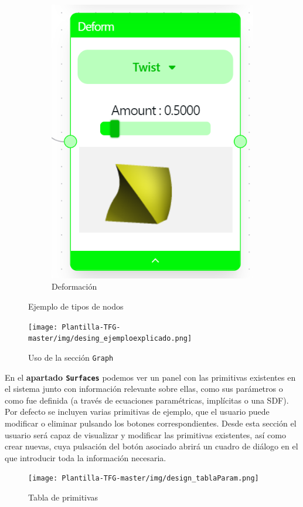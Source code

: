 \begin{figure}[!h]
\begin{subfigure}[b]{0.21\textwidth}
        \includegraphics[width=\textwidth]{Plantilla-TFG-master/img/nodo_def.png}
        \caption{Deformación}
    \end{subfigure}
    \hfill
    \caption{Ejemplo de tipos de nodos}
\end{figure}

\begin{figure}[ht!]
    \centering
    \texttt{[image: Plantilla-TFG-master/img/desing\_ejemploexplicado.png]}
    
    \caption{Uso de la sección \texttt{Graph}} 
    \label{fig:ejemploCsgExplicado}
\end{figure}

En el \textbf{apartado \texttt{Surfaces}} podemos ver un panel con las primitivas existentes en el sistema junto con información relevante sobre ellas, como sus parámetros o como fue definida (a través de ecuaciones paramétricas, implícitas o una SDF). Por defecto se incluyen varias primitivas de ejemplo, que el usuario puede modificar o eliminar pulsando los botones correspondientes. Desde esta sección el usuario será capaz de visualizar y modificar las primitivas existentes, así como crear nuevas, cuya pulsación del botón asociado abrirá un cuadro de diálogo en el que introducir toda la información necesaria.\newline
\begin{figure}[ht!]
    \centering
    \texttt{[image: Plantilla-TFG-master/img/design\_tablaParam.png]}
    \caption{Tabla de primitivas}
\end{figure}


